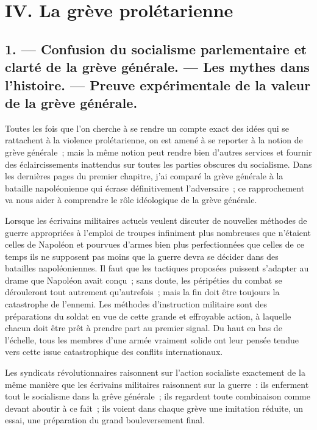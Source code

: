 \documentclass[french,twoside]{book} %
\begin{document}
 \section[{IV. La grève prolétarienne}]{IV. La grève prolétarienne}
\label{p15}\renewcommand{\leftmark}{IV. La grève prolétarienne}

\subsection[{1. — Confusion du socialisme parlementaire et clarté de la grève générale. — Les mythes dans l’histoire. — Preuve expérimentale de la valeur de la grève générale.}]{1. — Confusion du socialisme parlementaire et clarté de la grève générale. — Les mythes dans l’histoire. — Preuve expérimentale de la valeur de la grève générale.}
\label{p16}
\noindent Toutes les fois que l’on cherche à se rendre un compte exact des idées qui se rattachent à la violence prolétarienne, on est amené à se reporter à la notion de grève générale ; mais la même notion peut rendre bien d’autres services et fournir des éclaircissements inattendus sur toutes les parties obscures du socialisme. Dans les dernières pages du premier chapitre, j’ai comparé la grève générale à la bataille napoléonienne qui écrase définitivement l’adversaire ; ce rapprochement va nous  aider à comprendre le rôle idéologique de la grève générale.\par
Lorsque les écrivains militaires actuels veulent discuter de nouvelles méthodes de guerre appropriées à l’emploi de troupes infiniment plus nombreuses que n’étaient celles de Napoléon et pourvues d’armes bien plus perfectionnées que celles de ce temps ils ne supposent pas moins que la guerre devra se décider dans des batailles napoléoniennes. Il faut que les tactiques proposées puissent s’adapter au drame que Napoléon avait conçu ; sans doute, les péripéties du combat se dérouleront tout autrement qu’autrefois ; mais la fin doit être toujours la catastrophe de l’ennemi. Les méthodes d’instruction militaire sont des préparations du soldat en vue de cette grande et effroyable action, à laquelle chacun doit être prêt à prendre part au premier signal. Du haut en bas de l’échelle, tous les membres d’une armée vraiment solide ont leur pensée tendue vers cette issue catastrophique des conflits internationaux.\par
Les syndicats révolutionnaires raisonnent sur l’action socialiste exactement de la même manière que les écrivains militaires raisonnent sur la guerre : ils enferment tout le socialisme dans la grêve générale ; ils regardent toute combinaison comme devant aboutir à ce fait ; ils voient dans chaque grève une imitation réduite, un essai, une préparation du grand bouleversement final.\par
\end{document}
